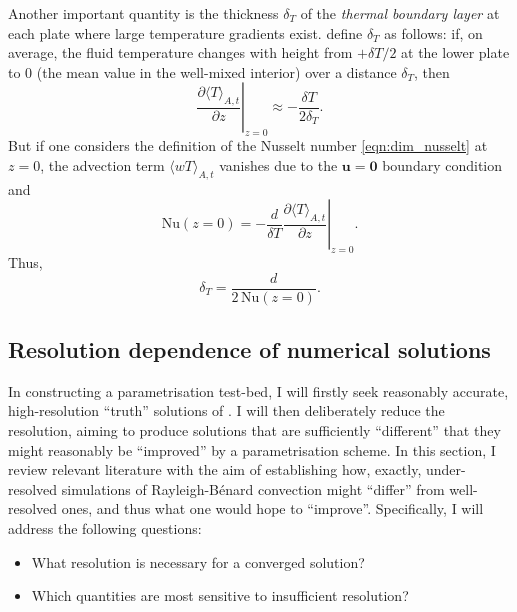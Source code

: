 \documentclass[titlepage]{article}
\numberwithin{equation}{section}
\newcommand{\pdiff}[2]{\frac{\partial #1}{\partial #2}}
\renewcommand\vec{\bm}
\newcommand{\nusselt}{\ensuremath{\mathrm{Nu}}}
\newcommand{\rb}{Rayleigh-B\'{e}nard}
\begin{document}
Another important quantity is the thickness $\delta_T$ of the \emph{thermal
boundary layer} at each plate where large temperature gradients exist.
\textcite{chilla2012} define $\delta_T$ as follows: if, on average, the fluid
temperature changes with height from $+\delta T/2$ at the lower plate to $0$
(the mean value in the well-mixed interior) over a distance $\delta_T$, then
\[
    \left. \pdiff{\langle T \rangle_{A,t}}{z} \right|_{z=0}
        \approx -\frac{\delta T}{2 \delta_T}.
\]
But if one considers the definition of the Nusselt number
\cref{eqn:dim_nusselt} at $z=0$, the advection term $\langle wT \rangle_{A,t}$
vanishes due to the $\vec{u} = \vec{0}$ boundary condition and
\[
    \nusselt(z=0) = -\frac{d}{\delta T}
        \left. \pdiff{\langle T \rangle_{A,t}}{z} \right|_{z=0}.
\]
Thus,
\begin{equation}
    \label{eqn:thermal_bl}
    \delta_T = \frac{d}{2\,\nusselt(z=0)}.
\end{equation}


\subsection{Resolution dependence of numerical solutions}
In constructing a parametrisation test-bed, I will firstly seek
reasonably accurate, high-resolution ``truth'' solutions of
. I will then deliberately reduce
the resolution, aiming to produce solutions that are sufficiently
``different'' that they might reasonably be ``improved'' by a parametrisation
scheme. In this section, I review relevant literature with the aim of
establishing how, exactly, under-resolved simulations of \rb{} convection
might ``differ'' from well-resolved ones, and thus what one would hope to
``improve''. Specifically, I will address the following questions:
\begin{itemize}
    \item What resolution is necessary for a converged solution?
    \item Which quantities are most sensitive to insufficient resolution?
\end{itemize}
\end{document}
